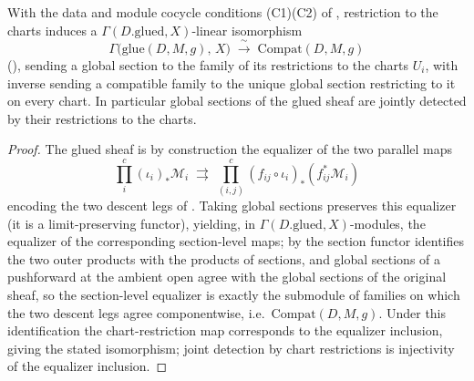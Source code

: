 \begin{lemma}
  \label{lem:glue_sections_equalizer}
  \leanok
  With the data and module cocycle conditions (C1)(C2) of
  , restriction to the charts induces a
  \(\Gamma(D.\mathrm{glued}, X)\)-linear isomorphism
  \[
    \Gamma\bigl(\mathrm{glue}(D,M,g),\, X\bigr) \;\xrightarrow{\ \sim\ }\;
      \mathrm{Compat}(D, M, g)
  \]
  (), sending a global section to the family
  of its restrictions to the charts \(U_i\), with inverse sending a
  compatible family to the unique global section restricting to it on every
  chart. In particular global sections of the glued sheaf are jointly
  detected by their restrictions to the charts.
\end{lemma}
\begin{proof}\leanok
  The glued sheaf is by construction the equalizer of the two parallel maps
  \[
    \textstyle\prod^{c}_i (\iota_i)_{*} \mathcal M_i \;\rightrightarrows\;
      \prod^{c}_{(i,j)} (f_{ij} \circ \iota_i)_{*} (f_{ij}^{*} \mathcal M_i)
  \]
  encoding the two descent legs of . Taking
  global sections preserves this equalizer (it is a limit-preserving
  functor), yielding, in \(\Gamma(D.\mathrm{glued}, X)\)-modules, the
  equalizer of the corresponding section-level maps; by
   the section functor identifies the two outer
  products with the products of sections, and global sections of a
  pushforward at the ambient open agree with the global sections of the
  original sheaf, so the section-level equalizer is exactly the submodule of
  families on which the two descent legs agree componentwise, i.e.\
  \(\mathrm{Compat}(D,M,g)\). Under this identification the chart-restriction
  map corresponds to the equalizer inclusion, giving the stated isomorphism;
  joint detection by chart restrictions is injectivity of the equalizer
  inclusion.
\end{proof}

